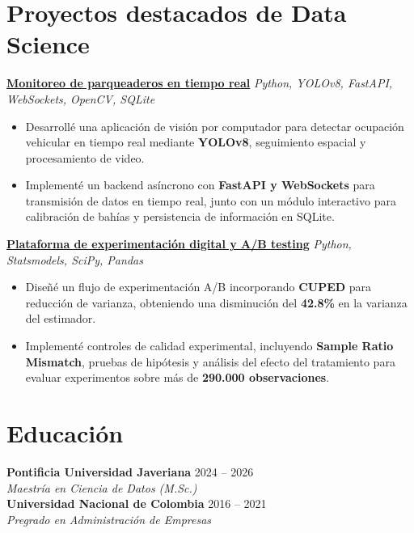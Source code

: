 \documentclass[letterpaper,10pt]{article}
\begin{document}
\section*{Proyectos destacados de Data Science}

\textbf{\href{https://cveram96.github.io/Portfolio/parkvision.html}{Monitoreo de parqueaderos en tiempo real}} \hfill \small{\textit{Python, YOLOv8, FastAPI, WebSockets, OpenCV, SQLite}}
\begin{itemize}
    \item Desarrollé una aplicación de visión por computador para detectar ocupación vehicular en tiempo real mediante \textbf{YOLOv8}, seguimiento espacial y procesamiento de video.
    \item Implementé un backend asíncrono con \textbf{FastAPI y WebSockets} para transmisión de datos en tiempo real, junto con un módulo interactivo para calibración de bahías y persistencia de información en SQLite.
\end{itemize}

\vspace{0.08cm}
\textbf{\href{https://cveram96.github.io/Portfolio/ab_testing.html}{Plataforma de experimentación digital y A/B testing}} \hfill \small{\textit{Python, Statsmodels, SciPy, Pandas}}
\begin{itemize}
    \item Diseñé un flujo de experimentación A/B incorporando \textbf{CUPED} para reducción de varianza, obteniendo una disminución del \textbf{42.8\%} en la varianza del estimador.
    \item Implementé controles de calidad experimental, incluyendo \textbf{Sample Ratio Mismatch}, pruebas de hipótesis y análisis del efecto del tratamiento para evaluar experimentos sobre más de \textbf{290.000 observaciones}.
\end{itemize}

\section*{Educación}
\textbf{Pontificia Universidad Javeriana} \hfill \small{2024 -- 2026} \\
\textsl{Maestría en Ciencia de Datos (M.Sc.)} \\[2pt]
\textbf{Universidad Nacional de Colombia} \hfill \small{2016 -- 2021} \\
\textsl{Pregrado en Administración de Empresas}
\end{document}
